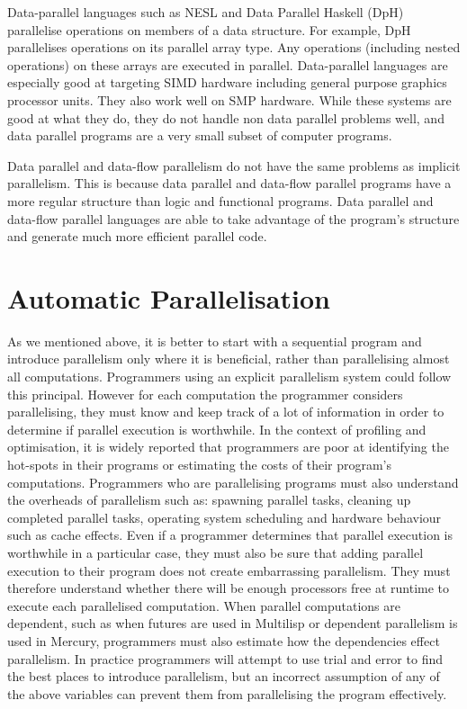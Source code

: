 Data-parallel languages such as
NESL \citep{blelloch:95:nesl} and
Data Parallel Haskell (DpH)
\citep{dph:2007:status_report,dph:2008:harnessing_the_multicores}
parallelise operations on members of a data structure.
For example,
DpH parallelises operations on its parallel array type.
Any operations (including nested operations) on these arrays are
executed in parallel.
Data-parallel languages are especially good at targeting SIMD hardware
including general purpose graphics processor units.
They also work well on SMP hardware.
While these systems are good at what they do,
they do not handle non data parallel problems well,
and data parallel programs are a very small subset of computer programs.

Data parallel and data-flow parallelism do not have the same
problems as implicit parallelism.
This is because data parallel and data-flow parallel programs have a
more regular structure than logic and functional programs.
Data parallel and data-flow parallel languages are able to take
advantage of the program's structure and generate much more efficient
parallel code.


\section{Automatic Parallelisation}
\label{sec:intro_auto_par}

As we mentioned above,
it is better to start with a sequential program and introduce parallelism
only where it is beneficial,
rather than parallelising almost all computations.
Programmers using an explicit parallelism system could follow this
principal.
However 
for each computation the programmer considers parallelising,
they must know and keep track of a lot of
information in order to determine if parallel execution is worthwhile.
In the context of profiling and optimisation,
it is widely reported that programmers are poor at identifying the
hot-spots in their programs or estimating the costs of their program's
computations.
Programmers who are parallelising programs must also understand the
overheads of parallelism such as:
spawning parallel tasks,
cleaning up completed parallel tasks,
operating system scheduling and
hardware behaviour such as cache effects.
Even if a programmer determines that parallel execution is worthwhile in
a particular case,
they must also be sure that adding parallel execution to their program
does not create embarrassing parallelism.
They must therefore understand whether there will be enough
processors free at runtime to execute each parallelised computation.
When parallel computations are dependent,
such as when futures are used in Multilisp or
dependent parallelism is used in Mercury,
programmers must also estimate how the dependencies effect parallelism.
In practice programmers will attempt to use trial and error to find the
best places to introduce parallelism,
but an incorrect assumption of any of the above variables can prevent them
from parallelising the program effectively.

